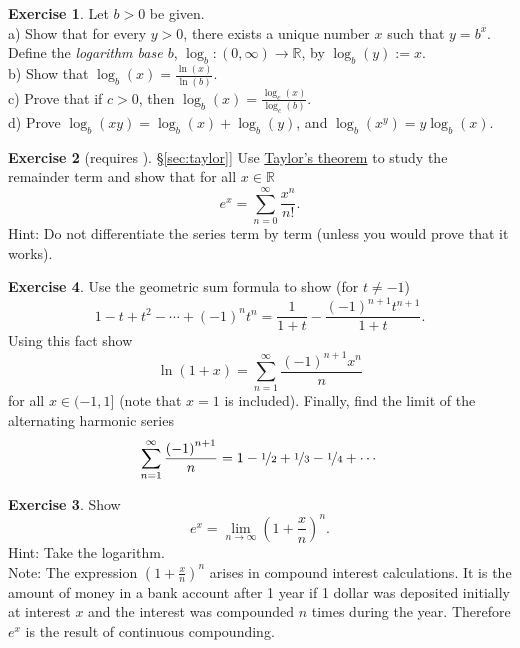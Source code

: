 \documentclass[12pt]{book}
\newcommand{\R}{{\mathbb{R}}}
\newcommand{\myindex}[1]{#1\index{#1}}
\theoremstyle{plain}
\theoremstyle{remark}
\theoremstyle{definition}
\theoremstyle{exercise}
\newtheorem{exercise}{Exercise}[section]
\theoremstyle{example}
\newcommand{\sectionref}[1]{\hyperref[#1]{\S\ref*{#1}}}
\begin{document}
\begin{exercise}
Let $b > 0$ be given.\\
a) Show that for every $y > 0$, there exists a unique number $x$
such that $y = b^x$.  Define
the \emph{\myindex{logarithm base $b$}},
$\log_b \colon (0,\infty) \to \R$, by
$\log_b(y) := x$.
\\
b) Show that $\log_b(x) = \frac{\ln(x)}{\ln(b)}$.
\\
c) Prove that if $c > 0$, then
$\log_b(x) = \frac{\log_c(x)}{\log_c(b)}$.
\\
d) Prove $\log_b(xy) =
\log_b(x)+\log_b(y)$, and $\log_b(x^y) = y \log_b(x)$.
\end{exercise}

\begin{exercise}[requires \sectionref{sec:taylor}]
Use \hyperref[thm:taylor]{Taylor's theorem} to study the remainder term and show that for
all $x \in \R$
\begin{equation*}
e^x = \sum_{n=0}^\infty \frac{x^n}{n!} .
\end{equation*}
Hint: Do not differentiate the series term by term (unless you would prove that it
works).
\end{exercise}

\begin{exercise}
Use the geometric sum formula to show (for $t\not= -1$)
\begin{equation*}
1-t+t^2-\cdots+{(-1)}^n t^n = \frac{1}{1+t} - \frac{{(-1)}^{n+1}t^{n+1}}{1+t}.
\end{equation*}
Using this fact show
\begin{equation*}
\ln (1+x) = \sum_{n=1}^\infty \frac{{(-1)}^{n+1}x^n}{n} 
\end{equation*}
for all $x \in (-1,1]$ (note that $x=1$ is included).  Finally,
find the limit of the alternating harmonic series
\begin{equation*}
\sum_{n=1}^\infty \frac{{(-1)}^{n+1}}{n} = 1 - \nicefrac{1}{2} +
\nicefrac{1}{3} - \nicefrac{1}{4} + \cdots
\end{equation*}

\begin{exercise}
Show 
\begin{equation*}
e^x = \lim_{n\to\infty} {\left( 1 + \frac{x}{n} \right)}^n .
\end{equation*}
Hint: Take the logarithm.\\
Note: The expression 
${\left( 1 + \frac{x}{n} \right)}^n$ arises in compound interest
calculations.  It is the amount of money in a bank account after 1 year
if 1 dollar was deposited initially at interest $x$
and the interest was compounded $n$
times during the year.  Therefore $e^x$ is the result of continuous
compounding.
\end{exercise}

\end{exercise}
\end{document}
